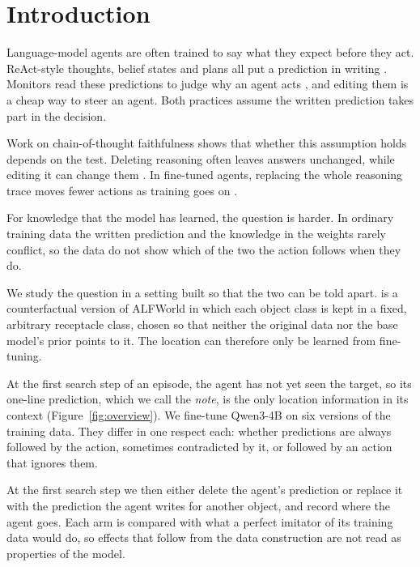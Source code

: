 \section{Introduction}
\label{sec:intro}

Language-model agents are often trained to say what they expect before they act. ReAct-style thoughts, belief states and plans all put a prediction in writing \citep{yao2023react,wang2026evu,zhang2025earlyexperience}. Monitors read these predictions to judge why an agent acts \citep{korbak2025monitorability}, and editing them is a cheap way to steer an agent. Both practices assume the written prediction takes part in the decision.

Work on chain-of-thought faithfulness shows that whether this assumption holds depends on the test. Deleting reasoning often leaves answers unchanged, while editing it can change them \citep{lanham2023faithfulness}. In fine-tuned agents, replacing the whole reasoning trace moves fewer actions as training goes on \citep{liu2026cotgains}.

For knowledge that the model has learned, the question is harder. In ordinary training data the written prediction and the knowledge in the weights rarely conflict, so the data do not show which of the two the action follows when they do.

We study the question in a setting built so that the two can be told apart. \alfcf{} is a counterfactual version of ALFWorld in which each object class is kept in a fixed, arbitrary receptacle class, chosen so that neither the original data nor the base model's prior points to it. The location can therefore only be learned from fine-tuning.

At the first search step of an episode, the agent has not yet seen the target, so its one-line prediction, which we call the \emph{note}, is the only location information in its context (Figure~\ref{fig:overview}). We fine-tune Qwen3-4B on six versions of the training data. They differ in one respect each: whether predictions are always followed by the action, sometimes contradicted by it, or followed by an action that ignores them.

At the first search step we then either delete the agent's prediction or replace it with the prediction the agent writes for another object, and record where the agent goes. Each arm is compared with what a perfect imitator of its training data would do, so effects that follow from the data construction are not read as properties of the model.

